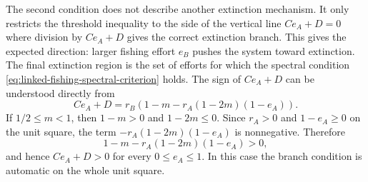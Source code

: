 \documentclass{article}
\numberwithin{equation}{section}
\begin{document}
The second condition does not describe another extinction mechanism. It
only restricts the threshold inequality to the side of the vertical line
$Ce_A+D=0$ where division by $Ce_A+D$ gives the correct extinction
branch. This gives the expected direction: larger fishing effort $e_B$
pushes the system toward extinction. The final extinction region is the
set of efforts for which the spectral condition
\eqref{eq:linked-fishing-spectral-criterion} holds.
The sign of $Ce_A+D$ can be understood directly from
\begin{equation*}
    Ce_A+D
    =
    r_B\left(1-m-r_A(1-2m)(1-e_A)\right).
\end{equation*}
If $1/2\leq m<1$, then $1-m>0$ and $1-2m\leq0$. Since
$r_A>0$ and $1-e_A\geq0$ on the unit square, the term
$-r_A(1-2m)(1-e_A)$ is nonnegative. Therefore
\begin{equation*}
    1-m-r_A(1-2m)(1-e_A)>0,
\end{equation*}
and hence $Ce_A+D>0$ for every $0\leq e_A\leq1$. In this case the
branch condition is automatic on the whole unit square.
\end{document}
